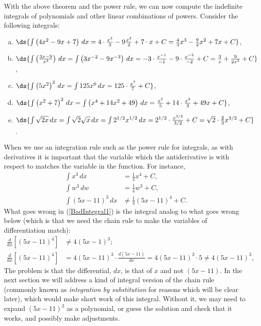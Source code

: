 With the above theorem and the power rule, we can now
compute the indefinite integrals of polynomials and other
linear combinations of powers.
\bex Consider the following integrals:

\begin{enumerate}[(a)]
\item $\ds{\int\left(4x^2-9x+7\right)\,dx
  =4\cdot\frac{x^3}{3}-9\frac{x^2}{2}+7\cdot x+C
  =\frac43x^3-\frac92x^2+7x+C}$,
\item $\ds{\int\left(\frac{3x-9}{x^3}\right)\,dx
=\int\left(3x^{-2}-9x^{-3}\right)\,dx
=-3\cdot\frac{x^{-1}}{-1}-9\cdot\frac{x^{-2}}{-2}+C
=\frac3x+\frac9{2x^2}+C}$,
\item$\ds{\int\left(5x^2\right)^3\,dx=\int125x^6\,dx=125\cdot\frac{x^7}7+C}$,
\item$\ds{\int\left(x^2+7\right)^2\,dx
=\int\left(x^4+14x^2+49\right)\,dx
=\frac{x^5}5+14\cdot\frac{x^3}3+49x+C}$,
\item$\ds{\int\sqrt{2x}\,dx=\int\sqrt2\sqrt{x}\,dx
=\int2^{1/2}x^{1/2}\,dx
=2^{1/2}\cdot\frac{x^{3/2}}{3/2}+C
=\sqrt{2}\cdot\frac23x^{3/2}+C}$.
\end{enumerate}
\eex
When we use an integration rule such as the power rule for
integrals,  as with derivatives it is important
that the variable which the antiderivative is with respect to 
matches the variable in the function.  For instance,
\begin{align}
\int x^3\,dx&=\frac14x^4+C,\\
\int w^3\,dw&=\frac14w^3+C,\\
\int (5x-11)^3\,dx&\ne\frac14(5x-11)^4+C.\label{BadIntegral1}
\end{align}
What goes wrong in (\ref{BadIntegral1}) is the integral analog
to what goes wrong  below (which is that we need the chain rule
to make the variables of differentiation match):
\begin{align*}
\frac{d}{dx}\left[(5x-11)^4\right]&\ne4(5x-1)^3;\\
\frac{d}{dx}\left[(5x-11)^4\right]
&=4(5x-11)^3\cdot\frac{d(5x-11)}{dx}=4(5x-11)^3\cdot5\ne4(5x-11)^3,\end{align*}
The problem is that the differential, $dx$, is that of
$x$ and not $(5x-11)$.  In the next section we will address
a kind of integral version of the chain rule (commonly known
as {\it integration by substitution} for reasons which
will be clear later), which would make short work of this
integral.  Without it, we may need to expand $(5x-11)^3$
as a polynomial, or guess the solution and check that it works,
and possibly make adjustments.
